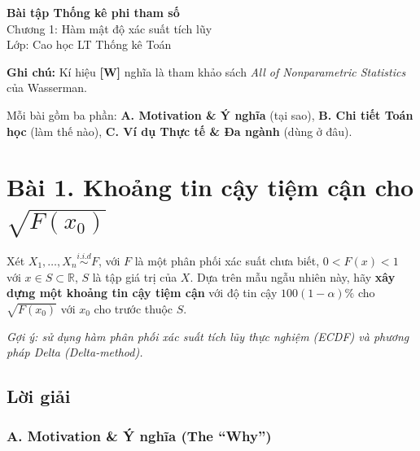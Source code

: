 \documentclass[12pt,a4paper]{article}
\begin{document}
\begin{center}
  {\LARGE\bfseries\color{accent} Bài tập Thống kê phi tham số}\\[6pt]
  {\large Chương 1: Hàm mật độ xác suất tích lũy}\\[8pt]
  {\normalsize Lớp: Cao học LT Thống kê Toán}
\end{center}

\vspace{4pt}

\begin{ghichu}
\textbf{Ghi chú:} Kí hiệu \textbf{[W]} nghĩa là tham khảo sách \textit{All of Nonparametric Statistics} của Wasserman.

Mỗi bài gồm ba phần: \textbf{A. Motivation \& Ý nghĩa} (tại sao), \textbf{B. Chi tiết Toán học} (làm thế nào), \textbf{C. Ví dụ Thực tế \& Đa ngành} (dùng ở đâu).
\end{ghichu}

\vspace{6pt}

\section{\texorpdfstring{Bài 1. Khoảng tin cậy tiệm cận cho \(\sqrt{F(x_0)}\)}{Bài 1. Khoảng tin cậy tiệm cận cho \textbackslash sqrt\{F(x\_0)\}}}\label{buxe0i-1.-khoux1ea3ng-tin-cux1eady-tiux1ec7m-cux1eadn-cho-sqrtfx_0}

\begin{debai}

Xét \(X_1, \dots, X_n \overset{i.i.d}{\sim} F\), với \(F\) là một phân phối xác suất chưa biết, \(0 < F(x) < 1\) với \(x \in S \subset \mathbb{R}\), \(S\) là tập giá trị của \(X\). Dựa trên mẫu ngẫu nhiên này, hãy \textbf{xây dựng một khoảng tin cậy tiệm cận} với độ tin cậy \(100(1-\alpha)\%\) cho \(\sqrt{F(x_0)}\) với \(x_0\) cho trước thuộc \(S\).

\emph{Gợi ý: sử dụng hàm phân phối xác suất tích lũy thực nghiệm (ECDF) và phương pháp Delta (Delta-method).}

\end{debai}
\subsection*{Lời giải}

\subsubsection{A. Motivation \& Ý nghĩa (The ``Why'')}\label{a.-motivation-uxfd-nghux129a-the-why}
\end{document}
